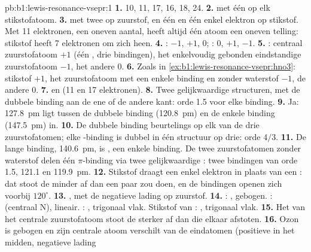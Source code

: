 \begin{solution}{pb:b1:lewis-resonance-vsepr:1}
\textbf{1.}  10,  11,  17,  16,  18,
 24.
\textbf{2.}  met één  op elk stikstofatoom.
\textbf{3.}  met twee  op zuurstof, en één 
en één enkel elektron op stikstof. Met 11 elektronen, een oneven aantal,
heeft altijd één atoom een oneven telling: stikstof heeft 7 elektronen om
zich heen.
\textbf{4.} : $-1$, $+1$, $0$; : $0$, $+1$, $-1$.
\textbf{5.} : centraal zuurstofatoom $+1$ (één , drie
bindingen), het enkelvoudig gebonden eindstandige zuurstofatoom $-1$, het
andere 0.
\textbf{6.} Zoals in \cref{ex:b1:lewis-resonance-vsepr:hno3}: stikstof
$+1$, het zuurstofatoom met een enkele binding en zonder waterstof $-1$,
de andere 0.
\textbf{7.}  en  (11 en 17 elektronen).
\textbf{8.} Twee gelijkwaardige structuren, met de dubbele binding aan
de ene of de andere kant: orde 1.5 voor elke binding.
\textbf{9.} Ja: \qty{127.8}{pm} ligt tussen de dubbele binding
(\qty{120.8}{pm}) en de enkele binding (\qty{147.5}{pm}) in.
\textbf{10.} De dubbele binding beurtelings op elk van de drie
zuurstofatomen; elke -binding is dubbel in één structuur op drie:
orde $4/3$.
\textbf{11.} De lange binding, \qty{140.6}{pm}, is , een enkele
binding. De twee zuurstofatomen zonder waterstof delen één
$\pi$-binding via twee gelijkwaardige : twee
bindingen van orde 1.5, 121.1 en \qty{119.9}{pm}.
\textbf{12.} Stikstof draagt een enkel elektron in plaats van een : dat stoot de  minder af dan een paar zou doen, en de
bindingen openen zich voorbij $120^\circ$.
\textbf{13.} , met de negatieve lading op zuurstof.
\textbf{14.} : , gebogen. :  (centraal
N), lineair. : , trigonaal vlak. Stikstof van
: , trigonaal vlak.
\textbf{15.} Het  van het centrale zuurstofatoom stoot de
 sterker af dan die elkaar afstoten.
\textbf{16.} Ozon is gebogen en zijn centrale atoom verschilt van de
eindatomen (positieve  in het midden, negatieve lading

\end{solution}
